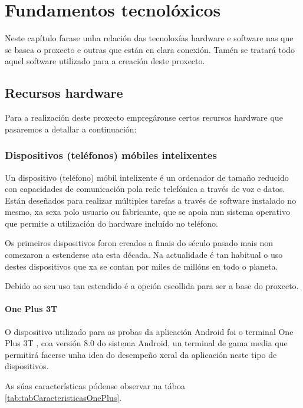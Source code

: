 \chapter{Fundamentos tecnolóxicos}
Neste capítulo farase unha relación das tecnoloxías hardware e software nas que se basea o proxecto e outras que están en clara conexión. Tamén se tratará todo aquel software utilizado para a creación deste proxecto.


\section{Recursos hardware}
Para a realización deste proxecto empregáronse certos recursos hardware que pasaremos a detallar a continuación:


\subsection{Dispositivos (teléfonos) móbiles intelixentes}
Un dispositivo (teléfono) móbil intelixente é un ordenador de tamaño reducido con capacidades de comunicación pola rede telefónica a través de voz e datos. Están deseñados para realizar múltiples tarefas a través de software instalado no mesmo, xa sexa polo usuario ou fabricante, que se apoia nun sistema operativo que permite a utilización do hardware incluído no teléfono.

Os primeiros dispositivos foron creados a finais do século pasado mais non comezaron a estenderse ata esta década. Na actualidade é tan habitual o uso destes dispositivos que xa se contan por miles de millóns en todo o planeta.

Debido ao seu uso tan estendido é a opción escollida para ser a base do proxecto.

\subsubsection{One Plus 3T}

O dispositivo utilizado para as probas da aplicación Android foi o terminal One Plus 3T \cite{onePlus}, coa versión 8.0 do sistema Android, un terminal de gama media que permitirá facerse unha idea do desempeño xeral da aplicación neste tipo de dispositivos.

As súas características pódense observar na táboa \ref{tab:tabCaracteristicasOnePlus}.

